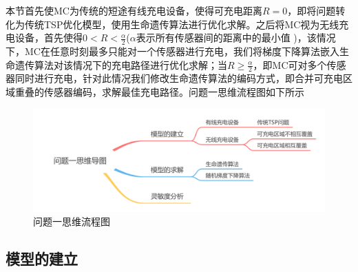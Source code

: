 \documentclass{whutmod}
\newcommand{\upcite}[1]{\textsuperscript{\cite{#1}}}
\begin{document}
		    本节首先使MC为传统的短途有线充电设备，使得可充电距离$R=0$，即将问题转化为传统TSP优化模型，使用生命遗传算法进行优化求解。之后将MC视为无线充电设备，首先使得$0<R<\frac{\alpha }{2}$($\alpha$表示所有传感器间的距离中的最小值 )，该情况下，MC在任意时刻最多只能对一个传感器进行充电，我们将梯度下降算法嵌入生命遗传算法对该情况下的充电路径进行优化求解；当$R\geqslant \frac{\alpha }{2}$，即MC可对多个传感器同时进行充电，针对此情况我们修改生命遗传算法的编码方式，即合并可充电区域重叠的传感器编码，求解最佳充电路径。问题一思维流程图如下所示
			
		  \begin{figure}[H]
				\centering
				\includegraphics[width=\textwidth]{figures/1.png}
				\caption{问题一思维流程图}\label{asdf}
			\end{figure}
		
		
		
		\subsection{模型的建立}
\end{document}
